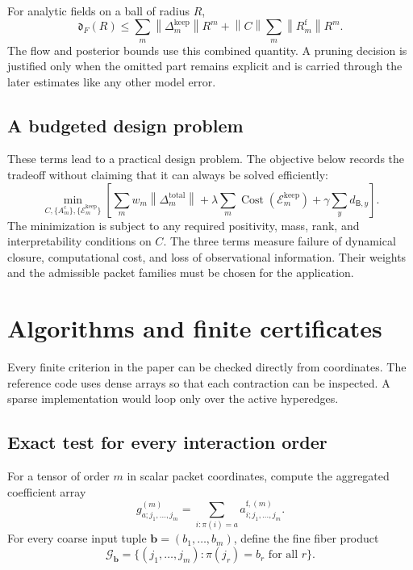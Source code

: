 \documentclass[11pt]{article}
\theoremstyle{definition}
\theoremstyle{remark}
\newcommand{\cE}{\mathcal E}
\newcommand{\cG}{\mathcal G}
\newcommand{\norm}[1]{\left\lVert #1\right\rVert}
\newcommand{\fine}{\mathrm f}
\newcommand{\coarse}{\mathrm c}
\newcommand{\Bup}{\mathsf B}
\begin{document}
For analytic fields on a ball of radius $R$,
\begin{equation}\label{eq:combined-field-majorant}
  \mathfrak d_F(R)
  \leq
  \sum_m
  \norm{\Delta_m^{\mathrm{keep}}}R^m
  +
  \norm{C}\sum_m\norm{R_m^{\fine}}R^m.
\end{equation}
The flow and posterior bounds use this combined quantity.  A pruning decision is justified only when the omitted part remains explicit and is carried through the later estimates like any other model error.

\subsection{A budgeted design problem}
These terms lead to a practical design problem.  The objective below records the tradeoff without claiming that it can always be solved efficiently:
\begin{equation}\label{eq:budgeted-design}
  \min_{C,\{A_m^{\coarse}\},\{\cE_m^{\mathrm{keep}}\}}
  \left[
  \sum_mw_m\norm{\Delta_m^{\mathrm{total}}}
  +\lambda\sum_m\operatorname{Cost}(\cE_m^{\mathrm{keep}})
  +\gamma\sum_y d_{\Bup,y}
  \right].
\end{equation}
The minimization is subject to any required positivity, mass, rank, and interpretability conditions on $C$.  The three terms measure failure of dynamical closure, computational cost, and loss of observational information.  Their weights and the admissible packet families must be chosen for the application.

\section{Algorithms and finite certificates}\label{sec:algorithms}



Every finite criterion in the paper can be checked directly from coordinates.  The reference code uses dense arrays so that each contraction can be inspected.  A sparse implementation would loop only over the active hyperedges.

\subsection{Exact test for every interaction order}
For a tensor of order $m$ in scalar packet coordinates, compute the aggregated coefficient array
\[
  g^{(m)}_{a;j_1,\ldots,j_m}
  =
  \sum_{i:\pi(i)=a}
  a^{\fine,(m)}_{i;j_1,\ldots,j_m}.
\]
For every coarse input tuple $\mathbf b=(b_1,\ldots,b_m)$, define the fine fiber product
\[
  \cG_{\mathbf b}
  =
  \{(j_1,\ldots,j_m):\pi(j_r)=b_r\text{ for all }r\}.
\]
\end{document}
